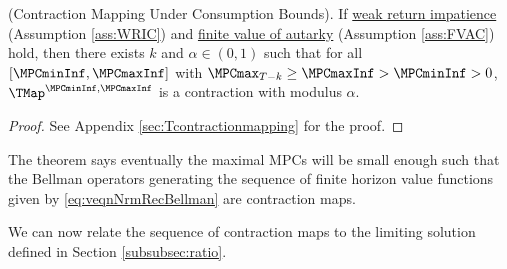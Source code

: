 \documentclass[BufferStockTheory]{subfiles}
\begin{document}
\begin{theorem}(Contraction Mapping Under Consumption Bounds).
\label{thm:cmap}
If \hyperlink{WRIC}{weak return impatience} (Assumption \ref{ass:WRIC})  and  \hyperlink{FVAC}{finite value of autarky} (Assumption \ref{ass:FVAC}) hold, then there exists $k$ and $\alpha\in (0,1)$ such that for all $[\MPCminInf, \MPCmaxInf]$ with $\MPCmax_{T-k}\geq \MPCmaxInf> \MPCminInf>0$, $\TMap^{\MPCminInf, \MPCmaxInf}$ is a contraction with modulus $\alpha$.
\end{theorem}
\begin{proof}
See Appendix \ref{sec:Tcontractionmapping} for the proof.

\end{proof}

The theorem says eventually the maximal MPCs will be small enough such that the Bellman operators generating the sequence of finite horizon value functions given by \eqref{eq:veqnNrmRecBellman} are contraction maps.

We can now relate the sequence of contraction maps to the limiting solution defined in Section \ref{subsubsec:ratio}.
\end{document}

